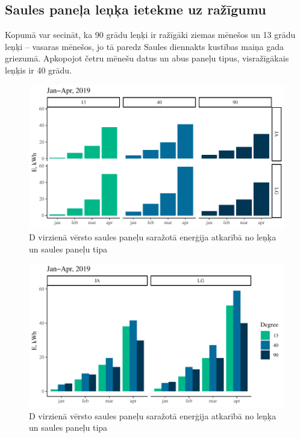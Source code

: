 \subsection{Saules paneļa leņķa ietekme uz ražīgumu}
Kopumā var secināt, ka 90 grādu leņķi ir ražīgāki ziemas mēnešos un 13 grādu leņķi -- vasaras mēnešos, jo tā paredz Saules diennakts kustības maiņa gada griezumā. Apkopojot četru mēnešu datus un abus paneļu tipus, visražīgākais leņķis ir 40 grādu.
\begin{figure}[h]
    \centering
    \includegraphics[width=\linewidth]{figures/results/jan_all_deg.pdf}
    \caption{D virzienā vērsto saules paneļu saražotā enerģija atkarībā no leņķa un saules paneļu tipa}
    \label{fig:ja_deg}
\end{figure}
\begin{figure}[h]
    \centering
    \includegraphics[width=\linewidth]{figures/results/degType.pdf}
    \caption{D virzienā vērsto saules paneļu saražotā enerģija atkarībā no leņķa un saules paneļu tipa}
    \label{fig:lg_ja_deg}
\end{figure}

